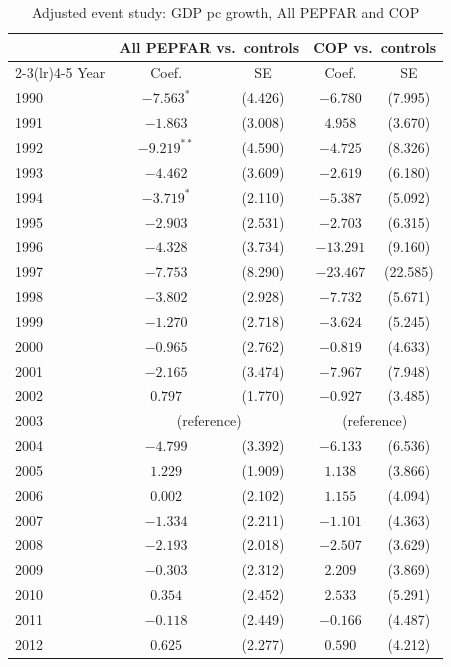 \begin{table}[htbp]
\centering
\small
\caption{Adjusted event study: GDP pc growth, All PEPFAR and COP}
\label{tab:crown_es_combined_gdp_pc_growth}
\begin{tabular}{lcccc}
\toprule
 & \multicolumn{2}{c}{All PEPFAR vs.\ controls} & \multicolumn{2}{c}{COP vs.\ controls} \\
\cmidrule(lr){2-3}\cmidrule(lr){4-5}
Year & Coef. & SE & Coef. & SE \\
\midrule
1990 & $-7.563^{*}$ & (4.426) & $-6.780$ & (7.995) \\
1991 & $-1.863$ & (3.008) & $4.958$ & (3.670) \\
1992 & $-9.219^{**}$ & (4.590) & $-4.725$ & (8.326) \\
1993 & $-4.462$ & (3.609) & $-2.619$ & (6.180) \\
1994 & $-3.719^{*}$ & (2.110) & $-5.387$ & (5.092) \\
1995 & $-2.903$ & (2.531) & $-2.703$ & (6.315) \\
1996 & $-4.328$ & (3.734) & $-13.291$ & (9.160) \\
1997 & $-7.753$ & (8.290) & $-23.467$ & (22.585) \\
1998 & $-3.802$ & (2.928) & $-7.732$ & (5.671) \\
1999 & $-1.270$ & (2.718) & $-3.624$ & (5.245) \\
2000 & $-0.965$ & (2.762) & $-0.819$ & (4.633) \\
2001 & $-2.165$ & (3.474) & $-7.967$ & (7.948) \\
2002 & $0.797$ & (1.770) & $-0.927$ & (3.485) \\
2003 & \multicolumn{2}{c}{(reference)} & \multicolumn{2}{c}{(reference)} \\
2004 & $-4.799$ & (3.392) & $-6.133$ & (6.536) \\
2005 & $1.229$ & (1.909) & $1.138$ & (3.866) \\
2006 & $0.002$ & (2.102) & $1.155$ & (4.094) \\
2007 & $-1.334$ & (2.211) & $-1.101$ & (4.363) \\
2008 & $-2.193$ & (2.018) & $-2.507$ & (3.629) \\
2009 & $-0.303$ & (2.312) & $2.209$ & (3.869) \\
2010 & $0.354$ & (2.452) & $2.533$ & (5.291) \\
2011 & $-0.118$ & (2.449) & $-0.166$ & (4.487) \\
2012 & $0.625$ & (2.277) & $0.590$ & (4.212) \\

\end{tabular}
\end{table}
